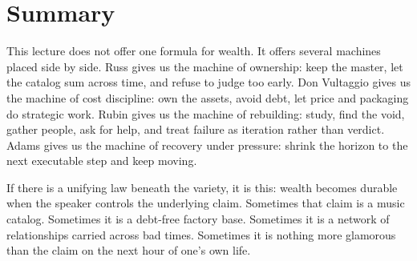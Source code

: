 \section{Summary}

This lecture does not offer one formula for wealth. It offers several machines placed side by side. Russ gives us the machine of ownership: keep the master, let the catalog sum across time, and refuse to judge too early. Don Vultaggio gives us the machine of cost discipline: own the assets, avoid debt, let price and packaging do strategic work. Rubin gives us the machine of rebuilding: study, find the void, gather people, ask for help, and treat failure as iteration rather than verdict. Adams gives us the machine of recovery under pressure: shrink the horizon to the next executable step and keep moving.

If there is a unifying law beneath the variety, it is this: wealth becomes durable when the speaker controls the underlying claim. Sometimes that claim is a music catalog. Sometimes it is a debt-free factory base. Sometimes it is a network of relationships carried across bad times. Sometimes it is nothing more glamorous than the claim on the next hour of one's own life.
